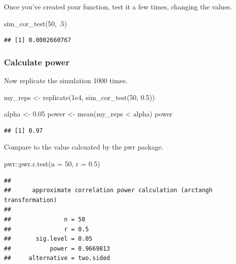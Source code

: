 \documentclass[
  oneside]{book}
\newenvironment{Shaded}{\begin{snugshade}}{\end{snugshade}}
\newcommand{\AttributeTok}[1]{\textcolor[rgb]{0.77,0.63,0.00}{#1}}
\newcommand{\DecValTok}[1]{\textcolor[rgb]{0.00,0.00,0.81}{#1}}
\newcommand{\FloatTok}[1]{\textcolor[rgb]{0.00,0.00,0.81}{#1}}
\newcommand{\FunctionTok}[1]{\textcolor[rgb]{0.00,0.00,0.00}{#1}}
\newcommand{\NormalTok}[1]{#1}
\newcommand{\OtherTok}[1]{\textcolor[rgb]{0.56,0.35,0.01}{#1}}
\newcommand{\SpecialCharTok}[1]{\textcolor[rgb]{0.00,0.00,0.00}{#1}}
\begin{document}
Once you've created your function, test it a few times, changing the values.

\begin{Shaded}
\begin{Highlighting}[]
\FunctionTok{sim\_cor\_test}\NormalTok{(}\DecValTok{50}\NormalTok{, .}\DecValTok{5}\NormalTok{)}
\end{Highlighting}
\end{Shaded}

\begin{verbatim}
## [1] 0.0002660767
\end{verbatim}

\hypertarget{calc-power-cor}{%
\subsubsection{Calculate power}\label{calc-power-cor}}

Now replicate the simulation 1000 times.

\begin{Shaded}
\begin{Highlighting}[]
\NormalTok{my\_reps }\OtherTok{\textless{}{-}} \FunctionTok{replicate}\NormalTok{(}\FloatTok{1e4}\NormalTok{, }\FunctionTok{sim\_cor\_test}\NormalTok{(}\DecValTok{50}\NormalTok{, }\FloatTok{0.5}\NormalTok{))}

\NormalTok{alpha }\OtherTok{\textless{}{-}} \FloatTok{0.05}
\NormalTok{power }\OtherTok{\textless{}{-}} \FunctionTok{mean}\NormalTok{(my\_reps }\SpecialCharTok{\textless{}}\NormalTok{ alpha)}
\NormalTok{power}
\end{Highlighting}
\end{Shaded}

\begin{verbatim}
## [1] 0.97
\end{verbatim}

Compare to the value calcuated by the pwr package.

\begin{Shaded}
\begin{Highlighting}[]
\NormalTok{pwr}\SpecialCharTok{::}\FunctionTok{pwr.r.test}\NormalTok{(}\AttributeTok{n =} \DecValTok{50}\NormalTok{, }\AttributeTok{r =} \FloatTok{0.5}\NormalTok{)}
\end{Highlighting}
\end{Shaded}

\begin{verbatim}
## 
##      approximate correlation power calculation (arctangh transformation) 
## 
##               n = 50
##               r = 0.5
##       sig.level = 0.05
##           power = 0.9669813
##     alternative = two.sided
\end{verbatim}
\end{document}
